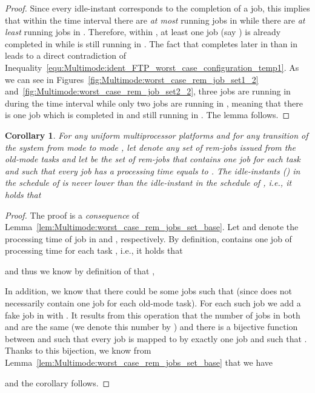 \documentclass{article}
\newtheorem{validity test}{Validity Test}
\newtheorem{proof}{Proof}
\newtheorem{Corollary}{Corollary}
\begin{document}
\begin{proof}
Since every idle-instant corresponds to the completion of a job, this implies that within the time interval  there are \emph{at most}  running jobs in  while there are \emph{at least}  running jobs in . Therefore, within , at least one job (say ) is already completed in  while  is still running in . The fact that  completes later in  than  in  leads to a direct contradiction of Inequality~\ref{equ:Multimode:ident_FTP_worst_case_configuration_temp1}. As we can see in Figures~\ref{fig:Multimode:worst_case_rem_job_set1_2} and~\ref{fig:Multimode:worst_case_rem_job_set2_2}, three jobs are running in  during the time interval  while only two jobs are running in , meaning that there is one job which is completed in  and still running in . The lemma follows.
\end{proof}

\begin{Corollary}
\label{cor:Multimode:worst_case_rem_jobs_set}
For any uniform multiprocessor platforms  and for any transition of the system from mode  to mode , let  denote any set of rem-jobs issued from the old-mode tasks and let  be the set of rem-jobs that contains one job  for each task  and such that every job  has a processing time equals to . The  idle-instants  () in the schedule of  is never lower than the  idle-instant  in the schedule of , i.e., it holds  that

\end{Corollary} 
\begin{proof}
The proof is a \emph{consequence} of Lemma~\ref{lem:Multimode:worst_case_rem_jobs_set_base}. Let  and  denote the processing time of job  in  and , respectively. By definition,  contains one job  of processing time  for each task , i.e., it holds  that
  
and thus we know by definition of  that , 

In addition, we know that there could be some jobs  such that  (since  does not necessarily contain one job for each old-mode task). For each such job  we add a fake job  in  with . It results from this operation that the number of jobs in both  and  are the same (we denote this number by ) and there is a bijective function between  and  such that every job  is mapped to by exactly one job  and such that . Thanks to this bijection, we know from Lemma~\ref{lem:Multimode:worst_case_rem_jobs_set_base} that  we have

and the corollary follows.
\end{proof}
\end{document}
